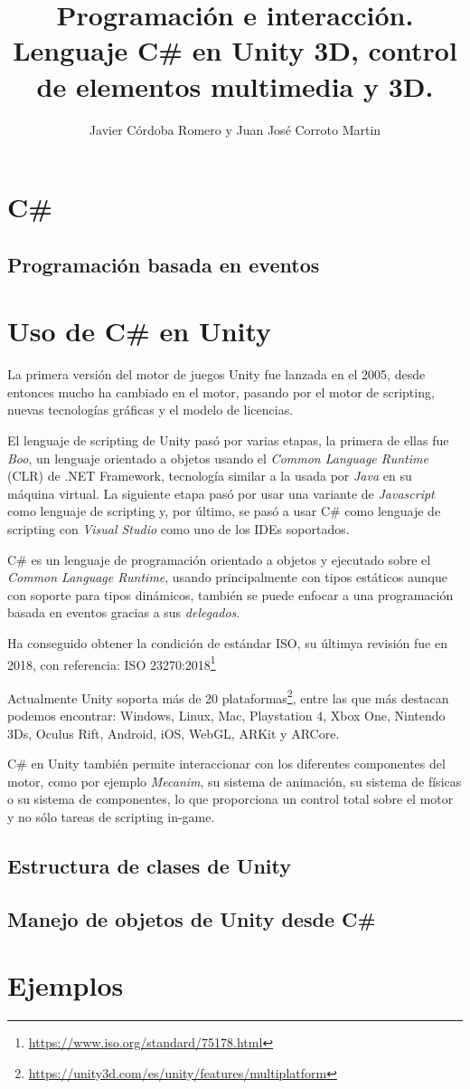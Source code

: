 \documentclass{pre-tfg}
\title{Programación e interacción. Lenguaje C\# en Unity 3D, control de elementos multimedia y 3D.}
\author{Javier Córdoba Romero y Juan José Corroto Martin}
\begin{document}
\maketitle
\tableofcontents

\newpage
\section{C\#}

\subsection{Programación basada en eventos}

\section{Uso de C\# en Unity}

La primera versión del motor de juegos Unity fue lanzada en el 2005, desde entonces mucho ha cambiado en el motor, pasando por el motor de scripting, nuevas tecnologías gráficas y el modelo de licencias.

El lenguaje de scripting de Unity pasó por varias etapas, la primera de ellas fue \emph{Boo}, un lenguaje orientado a objetos usando el \emph{Common Language Runtime} (CLR) de .NET Framework, tecnología similar a la usada por \emph{Java} en su máquina virtual. La siguiente etapa pasó por usar una variante de \emph{Javascript} como lenguaje de scripting y, por último, se pasó a usar C\# como lenguaje de scripting con \emph{Visual Studio} como uno de los IDEs soportados.

C\# es un lenguaje de programación orientado a objetos y ejecutado sobre el \emph{Common Language Runtime}, usando principalmente con tipos estáticos aunque con soporte para tipos dinámicos, también se puede enfocar a una programación basada en eventos gracias a sus \emph{delegados}.

Ha conseguido obtener la condición de estándar ISO, su últimya revisión fue en 2018, con referencia: ISO 23270:2018\footnote{\url{https://www.iso.org/standard/75178.html}}

Actualmente Unity soporta más de 20 plataformas\footnote{\url{https://unity3d.com/es/unity/features/multiplatform}}, entre las que más destacan podemos encontrar: Windows, Linux, Mac, Playstation 4, Xbox One, Nintendo 3Ds, Oculus Rift, Android, iOS, WebGL, ARKit y ARCore.

C\# en Unity también permite interaccionar con los diferentes componentes del motor, como por ejemplo \emph{Mecanim}, su sistema de animación, su sistema de físicas o su sistema de componentes, lo que proporciona un control total sobre el motor y no sólo tareas de scripting in-game.

\subsection{Estructura de clases de Unity}

\subsection{Manejo de objetos de Unity desde C\#}

\section{Ejemplos}
\end{document}
